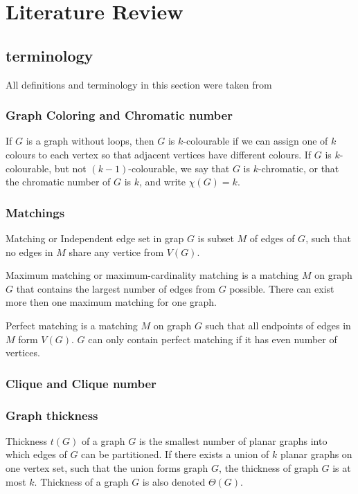 \chapter{Literature Review}
\section{terminology}
All definitions and terminology in this section were taken from \parencite{biggs1986graph}

\subsection{Graph Coloring and Chromatic number}
If $G$ is a graph without loops, then $G$ is $k$-colourable if we can assign one of $k$ colours
to each vertex so that adjacent vertices have different colours. If $G$ is $k$-colourable, but 
not $(k-1)$-colourable, we say that $G$ is $k$-chromatic, or that the chromatic number of $G$ is $k$, and write $\chi(G) = k$.

\subsection{Matchings}

Matching or Independent edge set in grap $G$ is subset $M$ of edges of $G$, such that no edges in $M$ share any vertice  from $V(G)$.

Maximum matching or maximum-cardinality matching is a matching $M$ on graph $G$ that contains the largest number of edges from $G$ possible. There can exist more then one maximum matching for one graph.

Perfect matching is a matching $M$ on graph $G$ such that all endpoints of edges in $M$ form $V(G)$. $G$ can only contain perfect matching if it has even number of vertices.

\subsection{Clique and Clique number}

\subsection{Graph thickness}

Thickness $t(G)$ of a graph $G$ is the smallest number of planar graphs into which edges of $G$ can be partitioned. If there exists a union of $k$ planar graphs on one vertex set, such that the union forms graph $G$, the thickness of graph $G$ is at most $k$. Thickness of a graph $G$ is also denoted $\Theta(G)$.

